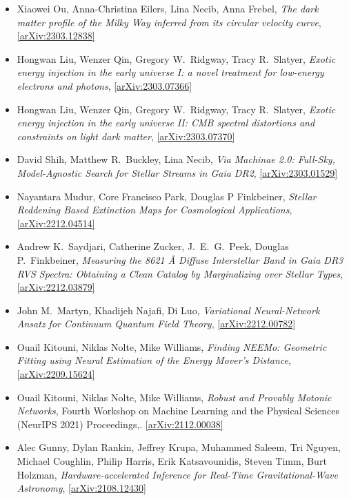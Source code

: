 \begin{itemize}
\item Xiaowei Ou, Anna-Christina Eilers, Lina Necib, Anna Frebel, \textit{The dark matter profile of the Milky Way inferred from its circular velocity curve}, \href{https://arxiv.org/abs/2303.12838}{[arXiv:2303.12838]} 
\item Hongwan Liu, Wenzer Qin, Gregory W.\  Ridgway, Tracy R.\  Slatyer, \textit{Exotic energy injection in the early universe I: a novel treatment for low-energy electrons and photons}, \href{https://arxiv.org/abs/2303.07366}{[arXiv:2303.07366]} 
\item Hongwan Liu, Wenzer Qin, Gregory W.\  Ridgway, Tracy R.\  Slatyer, \textit{Exotic energy injection in the early universe II: CMB spectral distortions and constraints on light dark matter}, \href{https://arxiv.org/abs/2303.07370}{[arXiv:2303.07370]} 
\item David Shih, Matthew R.\  Buckley, Lina Necib, \textit{Via Machinae 2.0: Full-Sky, Model-Agnostic Search for Stellar Streams in Gaia DR2}, \href{https://arxiv.org/abs/2303.01529}{[arXiv:2303.01529]} 
\item Nayantara Mudur, Core Francisco Park, Douglas P Finkbeiner, \textit{Stellar Reddening Based Extinction Maps for Cosmological Applications}, \href{https://arxiv.org/abs/2212.04514}{[arXiv:2212.04514]} 
\item Andrew K.\  Saydjari, Catherine Zucker, J.\  E.\  G.\  Peek, Douglas P.\  Finkbeiner, \textit{Measuring the 8621 Å Diffuse Interstellar Band in Gaia DR3 RVS Spectra: Obtaining a Clean Catalog by Marginalizing over Stellar Types}, \href{https://arxiv.org/abs/2212.03879}{[arXiv:2212.03879]} 
\item John M.\  Martyn, Khadijeh Najafi, Di Luo, \textit{Variational Neural-Network Ansatz for Continuum Quantum Field Theory}, \href{https://arxiv.org/abs/2212.00782}{[arXiv:2212.00782]} 
\item Ouail Kitouni, Niklas Nolte, Mike Williams, \textit{Finding NEEMo: Geometric Fitting using Neural Estimation of the Energy Mover's Distance}, \href{https://arxiv.org/abs/2209.15624}{[arXiv:2209.15624]} 
\item Ouail Kitouni, Niklas Nolte, Mike Williams, \textit{Robust and Provably Motonic Networks}, Fourth Workshop on Machine Learning and the Physical Sciences (NeurIPS 2021) Proceedings,. \href{https://arxiv.org/abs/2112.00038}{[arXiv:2112.00038]} 
\item Alec Gunny, Dylan Rankin, Jeffrey Krupa, Muhammed Saleem, Tri Nguyen, Michael Coughlin, Philip Harris, Erik Katsavounidis, Steven Timm, Burt Holzman, \textit{Hardware-accelerated Inference for Real-Time Gravitational-Wave Astronomy}, \href{https://arxiv.org/abs/2108.12430}{[arXiv:2108.12430]} 

\end{itemize}
